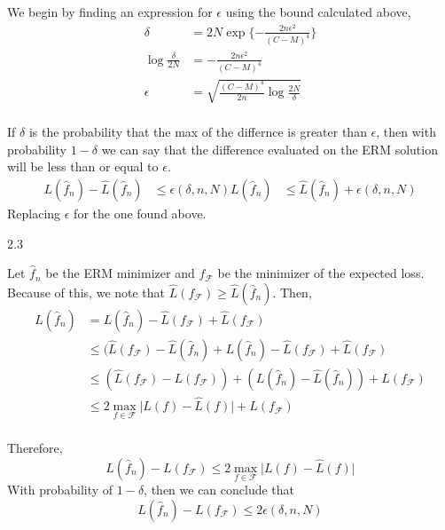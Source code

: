 \documentclass[12pt]{report}
\begin{document}
We begin by finding an expression for $\epsilon$ using the bound calculated above,
\begin{equation}
  \begin{aligned}
    \delta & = 2N\exp\{-\frac{2n\epsilon^{2}}{(C-M)^{4}}\} \\
      \log \frac{\delta}{2N} &= - \frac{2n\epsilon^{2}}{(C-M)^{4}} \\
      \epsilon &= \sqrt{\frac{(C-M)^{4}}{2n} \log \frac{2N}{\delta}} \\
  \end{aligned}
\end{equation}

If $\delta$ is the probability that the max of the differnce is greater than $\epsilon$, then with probability $1-\delta$ we can say that the difference evaluated on the ERM solution will be less than or equal to $\epsilon$.
\begin{equation}
  \begin{aligned}
    L(\hat{f}_{n}) - \hat{L}(\hat{f}_{n}) & \leq \epsilon(\delta, n, N)
    L(\hat{f}_{n}) & \leq \hat{L}(\hat{f}_{n}) + \epsilon(\delta, n, N)
  \end{aligned}
\end{equation}
Replacing $\epsilon$ for the one found above.

2.3

Let $\hat{f}_{n}$ be the ERM minimizer and $f_{\mathcal{F}}$ be the minimizer of the expected loss. Because of this, we note that $\hat{L}(f_{\mathcal{F}}) \geq \hat{L}(\hat{f}_{n})$. Then,
\begin{equation}
  \begin{aligned}
    L(\hat{f}_{n}) & = L(\hat{f}_{n}) - \hat{L}(f_{\mathcal{F}}) + \hat{L}(f_{\mathcal{F}}) \\
    & \leq (\hat{L}(f_{\mathcal{F}}) - \hat{L}(\hat{f}_{n}) + L(\hat{f}_{n}) - \hat{L}(f_{\mathcal{F}}) + \hat{L}(f_{\mathcal{F}}) \\
    & \leq (\hat{L}(f_{\mathcal{F}}) - L(f_{\mathcal{F}})) + (L(\hat{f}_{n}) -\hat{L}(\hat{f}_{n})) + L(f_{\mathcal{F}}) \\
    & \leq 2\max_{f \in \mathcal{F}}\lvert L(f) - \hat{L}(f) \rvert + L(f_{\mathcal{F}}) \\
  \end{aligned}
\end{equation}

Therefore,
$$ L(\hat{f}_{n}) - L(f_{\mathcal{F}}) \leq  2\max_{f \in \mathcal{F}}\lvert L(f) - \hat{L}(f) \rvert $$
With probability of $1-\delta$, then we can conclude that
$$ L(\hat{f}_{n}) - L(f_{\mathcal{F}}) \leq 2\epsilon(\delta, n, N) $$
\end{document}
